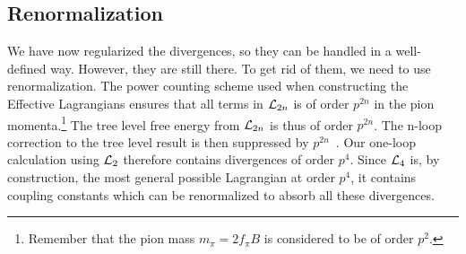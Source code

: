 \subsection{Renormalization}
We have now regularized the divergences, so they can be handled in a well-defined way.
However, they are still there.
To get rid of them, we need to use renormalization.
The power counting scheme used when constructing the Effective Lagrangians ensures that all terms in $\mathcal{L}_{2n}$ is of order $p^{2n}$ in the pion momenta.\footnote{Remember that the pion mass $m_\pi = 2 f_\pi B$ is considered to be of order $p^2$.}
The tree level free energy from $\mathcal{L}_{2n}$ is thus of order $p^{2n}$.
The n-loop correction to the tree level result is then suppressed by $p^{2n}$~\cite{Gasser-Leutwyler:chiral,WeinbergPhenom}.
Our one-loop calculation using $\mathcal{L}_2$ therefore contains divergences of order $p^{4}$. 
Since $\mathcal{L}_4$ is, by construction, the most general possible Lagrangian at order $p^4$, it contains coupling constants which can be renormalized to absorb all these divergences.

